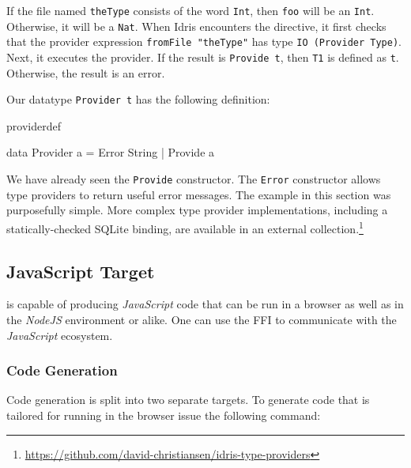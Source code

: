 \noindent
If the file named \texttt{theType} consists of the word \texttt{Int}, then
\texttt{foo} will be an \texttt{Int}. Otherwise, it will be a \texttt{Nat}.
When Idris encounters the directive, it first checks that the provider
expression \texttt{fromFile "theType"} has type \texttt{IO (Provider
  Type)}. Next, it executes the provider. If the result is \texttt{Provide t},
then \texttt{T1} is defined as \texttt{t}. Otherwise, the result is an error.

Our datatype \texttt{Provider t} has the following definition:

\begin{SaveVerbatim}{providerdef}

data Provider a = Error String
                | Provide a

\end{SaveVerbatim}

\noindent
We have already seen the \texttt{Provide} constructor. The \texttt{Error}
constructor allows type providers to return useful error messages.  The
example in this section was purposefully simple. More complex type provider
implementations, including a statically-checked SQLite binding, are available
in an external collection.\footnote{\url{https://github.com/david-christiansen/idris-type-providers}}

\subsection{JavaScript Target}

\Idris{} is capable of producing \emph{JavaScript} code that can be run in a browser
as well as in the \emph{NodeJS} environment or alike. One can use the FFI to
communicate with the \emph{JavaScript} ecosystem.

\subsubsection*{Code Generation}

\noindent
Code generation is split into two separate targets. To generate code that is
tailored for running in the browser issue the following command:


